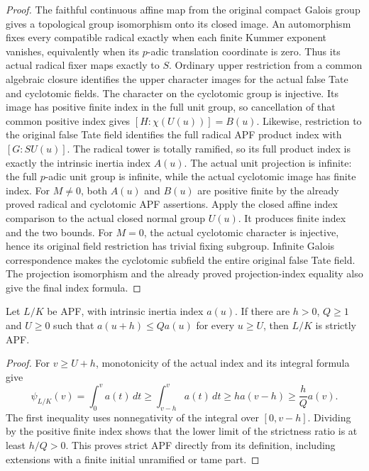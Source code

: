 \begin{proof}
The faithful continuous affine map from the original compact Galois
group gives a topological group isomorphism onto its closed image.
An automorphism fixes every compatible radical exactly when each
finite Kummer exponent vanishes, equivalently when its $p$-adic
translation coordinate is zero. Thus its actual radical fixer
maps exactly to $S$.
Ordinary upper restriction from a common algebraic closure identifies
the upper character images for the actual false Tate and cyclotomic
fields. The character on the cyclotomic group is injective. Its image
has positive finite index in the full unit group, so cancellation
of that common positive index gives $[H:\chi(U(u))]=B(u)$.
Likewise, restriction to the original false Tate field identifies the
full radical APF product index with $[G:SU(u)]$. The radical tower
is totally ramified, so its full product index is exactly the
intrinsic inertia index $A(u)$.
The actual unit projection is infinite: the full $p$-adic unit
group is infinite, while the actual cyclotomic image has finite
index. For $M\ne0$, both $A(u)$ and $B(u)$ are positive finite
by the already proved radical and cyclotomic APF assertions.
Apply the closed affine index comparison to the actual closed
normal group $U(u)$. It produces finite index and the two bounds.
For $M=0$, the actual cyclotomic character is injective, hence
its original field restriction has trivial fixing subgroup.
Infinite Galois correspondence makes the cyclotomic subfield the
entire original false Tate field. The projection isomorphism and
the already proved projection-index equality also give the final
index formula.
\end{proof}

\begin{lemma}
\label{ft:direct-index-growth-strictness}
\leanok
Let $L/K$ be APF, with intrinsic inertia index $a(u)$.
If there are $h>0$, $Q\geq1$ and $U\geq0$ such that
$a(u+h)\leq Q a(u)$ for every $u\geq U$, then $L/K$ is
strictly APF.
\end{lemma}
\begin{proof}
For $v\geq U+h$, monotonicity of the actual index and its integral
formula give
\[
 \psi_{L/K}(v)=\int_0^v a(t)\,dt
 \geq\int_{v-h}^v a(t)\,dt
 \geq h a(v-h)\geq\frac hQ a(v).
\]
The first inequality uses nonnegativity of the integral over
$[0,v-h]$. Dividing by the positive finite index shows that
the lower limit of the strictness ratio is at least $h/Q>0$.
This proves strict APF directly from its definition, including
extensions with a finite initial unramified or tame part.
\end{proof}

